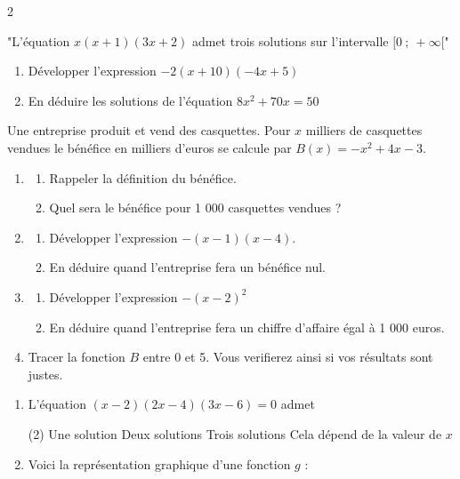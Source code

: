\documentclass[10pt,a4paper]{article}
\begin{document}
\begin{multicols}{2}
\begin{exo}
"L'équation \(x(x+1)(3x+2)\) admet trois solutions sur l'intervalle \([0\ ;\ +\infty[\)"
\end{exo}

\begin{exo}
    \begin{enumerate}
        \item Développer l'expression \(-2(x+10)(-4x+5)\)
        \item En déduire les solutions de l'équation \(8x^2+70x = 50\)
    \end{enumerate}
\end{exo}

\begin{exo}[][]
    Une entreprise produit et vend des casquettes. Pour \(x\) milliers de casquettes vendues le bénéfice en milliers d'euros se calcule par \(B(x) = -x^2+4x-3\).
    \begin{enumerate}
        \item \begin{enumerate}
            \item Rappeler la définition du bénéfice.
            \item Quel sera le bénéfice pour 1 000 casquettes vendues ?
        \end{enumerate}
        \item \begin{enumerate}
            \item Développer l'expression \(-(x-1)(x-4)\).
            \item En déduire quand l'entreprise fera un bénéfice nul.
        \end{enumerate}
        \item \begin{enumerate}
            \item Développer l'expression \(-(x-2)^2\)
            \item En déduire quand l'entreprise fera un chiffre d'affaire égal à 1 000 euros.
        \end{enumerate}
        \item Tracer la fonction \(B\) entre 0 et 5. Vous verifierez ainsi si vos résultats sont justes.
    \end{enumerate}
\end{exo}

\begin{exo}[QCM][appro]
    \begin{enumerate}
        \item L'équation \((x-2)(2x-4)(3x-6)=0\) admet \begin{tasks}(2)
            \task Une solution
            \task Deux solutions
            \task Trois solutions
            \task Cela dépend de la valeur de \(x\)
        \end{tasks}
        \item Voici la représentation graphique d'une fonction \(g\) :
        

\end{enumerate}
\end{exo}
\end{multicols}
\end{document}
